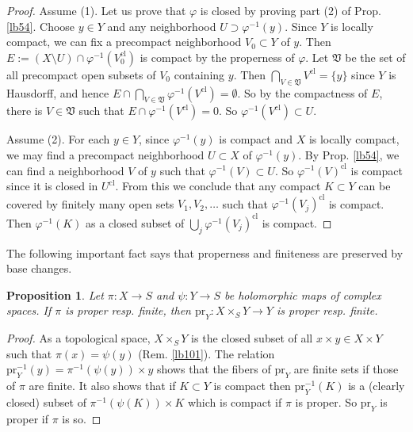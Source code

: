 \documentclass[12pt,b5paper,notitlepage]{report}
\theoremstyle{definition}
\theoremstyle{plain}
\newtheorem{pp}[df]{Proposition}
\newcommand{\fk}{\mathfrak}
\newcommand{\pr}{\mathrm {pr}}
\newcommand{\cl}{\mathrm{cl}}
\numberwithin{equation}{section}
\begin{document}
\begin{proof}
Assume (1). Let us prove that $\varphi$ is closed by proving part (2) of Prop. \ref{lb54}. Choose $y\in Y$ and any neighborhood $U\supset\varphi^{-1}(y)$. Since $Y$ is locally compact, we can fix a precompact neighborhood $V_0\subset Y$ of $y$. Then $E:=(X\setminus U)\cap \varphi^{-1}(V_0^\cl)$ is compact by the properness of $\varphi$. Let $\fk V$ be the set of all precompact open subsets of $V_0$ containing $y$. Then $\bigcap_{V\in\fk V}V^\cl=\{y\}$  since $Y$ is Hausdorff, and hence $E\cap\bigcap_{V\in\fk V}\varphi^{-1}(V^\cl)=\emptyset$. So by the compactness of $E$, there is $V\in\fk V$ such that $E\cap\varphi^{-1}(V^\cl)=0$. So $\varphi^{-1}(V^\cl)\subset U$.

Assume (2). For each $y\in Y$, since $\varphi^{-1}(y)$ is compact and $X$ is locally compact, we may find a precompact neighborhood $U\subset X$ of $\varphi^{-1}(y)$. By Prop. \ref{lb54}, we can find a neighborhood $V$ of $y$ such that $\varphi^{-1}(V)\subset U$. So $\varphi^{-1}(V)^\cl$ is compact since it is closed in $U^\cl$. From this we conclude that any compact $K\subset Y$ can be covered by finitely many open sets $V_1,V_2,\dots$ such that $\varphi^{-1}(V_j)^\cl$ is compact. Then $\varphi^{-1}(K)$ as a closed subset of $\bigcup_j \varphi^{-1}(V_j)^\cl$ is compact.
\end{proof}





The following important fact says that properness and finiteness are preserved by base changes.
\begin{pp}\label{lb91}
Let $\pi:X\rightarrow S$ and $\psi:Y\rightarrow S$ be holomorphic maps of complex spaces. If $\pi$ is proper resp. finite, then $\pr_Y:X\times_SY\rightarrow Y$ is proper resp. finite.
\end{pp}


\begin{proof}
As a topological space, $X\times_SY$ is the closed subset of all $x\times y\in X\times Y$ such that $\pi(x)=\psi(y)$ (Rem. \ref{lb101}). The relation $\pr_Y^{-1}(y)=\pi^{-1}(\psi(y))\times y$ shows that the fibers of $\pr_Y$ are finite sets if those of $\pi$ are finite. It also shows that if $K\subset Y$ is compact then $\pr_Y^{-1}(K)$ is a (clearly closed) subset of $\pi^{-1}(\psi(K))\times K$ which is compact if $\pi$ is proper. So $\pr_Y$ is proper if $\pi$ is so.
\end{proof}
\end{document}
